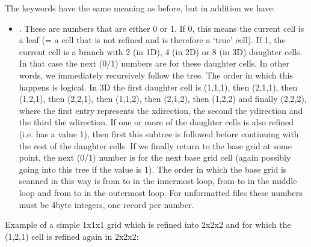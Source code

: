 \documentclass[letterpaper,10pt,english]{sphinxmanual}
\begin{document}
The keywords have the same meaning as before, but in addition we have:
\begin{itemize}
\item {} 
 . These are numbers that are either 0
or 1. If 0, this means the current cell is a leaf (= a cell that is not
refined and is therefore a ‘true’ cell). If 1, the current cell is a branch
with 2 (in 1\sphinxhyphen{}D), 4 (in 2\sphinxhyphen{}D) or 8 (in 3\sphinxhyphen{}D) daughter cells. In that case the
next (0/1) numbers are for these daughter cells. In other words, we
immediately recursively follow the tree. The order in which this happens is
logical. In 3\sphinxhyphen{}D the first daughter cell is (1,1,1), then (2,1,1), then
(1,2,1), then (2,2,1), then (1,1,2), then (2,1,2), then (1,2,2) and finally
(2,2,2), where the first entry represents the x\sphinxhyphen{}direction, the second the
y\sphinxhyphen{}direction and the third the z\sphinxhyphen{}direction. If one or more of the daughter
cells is also refined (i.e. has a value 1), then first this sub\sphinxhyphen{}tree is
followed before continuing with the rest of the daughter cells. If we finally
return to the base grid at some point, the next (0/1) number is for the next
base grid cell (again possibly going into this tree if the value is 1). The
order in which the base grid is scanned in this way is from  to  in
the innermost loop, from  to  in the middle loop and from  to
 in the outermost loop. For unformatted files these numbers must be
4\sphinxhyphen{}byte integers, one record per number.

\end{itemize}

Example of a simple 1x1x1 grid which is refined into 2x2x2 and for
which the (1,2,1) cell is refined again in 2x2x2:

\begin{sphinxVerbatim}[commandchars=\\\{\}]
    
    
  
  
  
  
\end{sphinxVerbatim}
\end{document}
